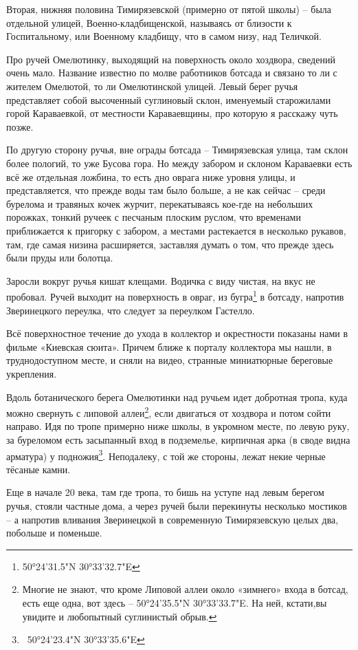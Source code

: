 Вторая, нижняя половина Тимирязевской (примерно от пятой школы) – была отдельной улицей, Военно-кладбищенской, называясь от близости к Госпитальному, или Военному кладбищу, что в самом низу, над Теличкой.

Про ручей Омелютинку, выходящий на поверхность около хоздвора, сведений очень мало. Название известно по молве работников ботсада и связано то ли с жителем Омелютой, то ли Омелютинской улицей. Левый берег ручья представляет собой высоченный суглиновый склон, именуемый старожилами горой Караваевкой, от местности Караваевщины, про которую я расскажу чуть позже. 

По другую сторону ручья, вне ограды ботсада – Тимирязевская улица, там склон более пологий, то уже Бусова гора. Но между забором и склоном Караваевки есть всё же отдельная ложбина, то есть дно оврага ниже уровня улицы, и представляется, что прежде воды там было больше, а не как сейчас – среди бурелома и травяных кочек журчит, перекатываясь кое-где на небольших порожках, тонкий ручеек с песчаным плоским руслом, что временами приближается к пригорку с забором, а местами растекается в несколько рукавов, там, где самая низина расширяется, заставляя думать о том, что прежде здесь были пруды или болотца.

Заросли вокруг ручья кишат клещами. Водичка с виду чистая, на вкус не пробовал. Ручей выходит на поверхность в овраг, из бугра\footnote{50°24'31.5"N 30°33'32.7"E} в ботсаду, напротив Зверинецкого переулка, что следует за переулком Гастелло.

Всё поверхностное течение до ухода в коллектор и окрестности показаны нами в фильме «Киевская сюита». Причем ближе к порталу коллектора мы нашли, в труднодоступном месте, и сняли на видео, странные миниатюрные береговые укрепления.

Вдоль ботанического берега Омелютинки над ручьем идет добротная тропа, куда можно свернуть с липовой аллеи\footnote{Многие не знают, что кроме Липовой аллеи около «зимнего» входа в ботсад, есть еще одна, вот здесь – 50°24'35.5"N 30°33'33.7"E. На ней, кстати,вы увидите и любопытный суглинистый обрыв.}, если двигаться от хоздвора и потом сойти направо. Идя по тропе примерно ниже школы, в укромном месте, по левую руку, за буреломом есть засыпанный вход в подземелье, кирпичная арка (в своде видна арматура) у подножия\footnote{~50°24'23.4"N 30°33'35.6"E}. Неподалеку, с той же стороны, лежат некие черные тёсаные камни.

Еще в начале 20 века, там где тропа, то бишь на уступе над левым берегом ручья, стояли частные дома, а через ручей были перекинуты несколько мостиков – а напротив вливания Зверинецкой в современную Тимирязевскую целых два, побольше и поменьше.

